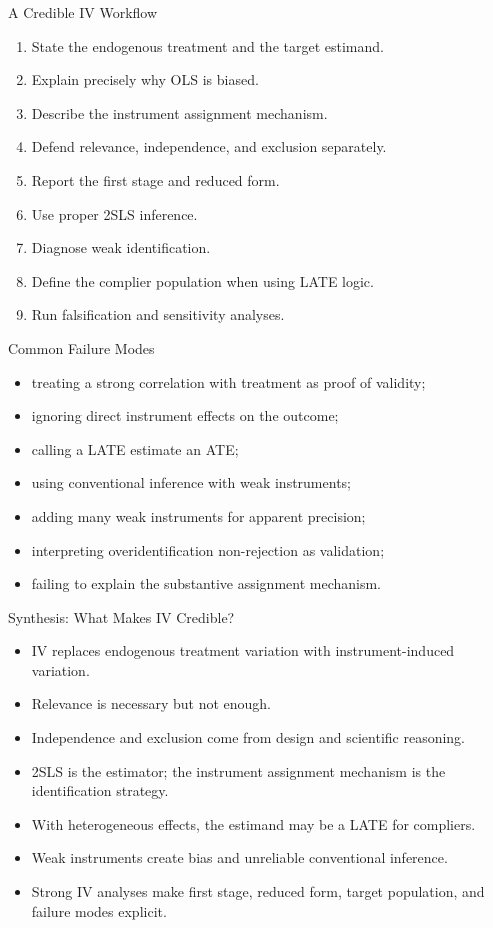 \documentclass[aspectratio=169,11pt]{beamer}
\begin{document}
\begin{frame}{A Credible IV Workflow}
\begin{enumerate}
\item State the endogenous treatment and the target estimand.
\item Explain precisely why OLS is biased.
\item Describe the instrument assignment mechanism.
\item Defend relevance, independence, and exclusion separately.
\item Report the first stage and reduced form.
\item Use proper 2SLS inference.
\item Diagnose weak identification.
\item Define the complier population when using LATE logic.
\item Run falsification and sensitivity analyses.
\end{enumerate}
\end{frame}

\begin{frame}{Common Failure Modes}
\begin{itemize}
\item treating a strong correlation with treatment as proof of validity;
\item ignoring direct instrument effects on the outcome;
\item calling a LATE estimate an ATE;
\item using conventional inference with weak instruments;
\item adding many weak instruments for apparent precision;
\item interpreting overidentification non-rejection as validation;
\item failing to explain the substantive assignment mechanism.
\end{itemize}
\end{frame}

\begin{frame}{Synthesis: What Makes IV Credible?}
\begin{itemize}
\item IV replaces endogenous treatment variation with instrument-induced variation.
\item Relevance is necessary but not enough.
\item Independence and exclusion come from design and scientific reasoning.
\item 2SLS is the estimator; the instrument assignment mechanism is the identification strategy.
\item With heterogeneous effects, the estimand may be a LATE for compliers.
\item Weak instruments create bias and unreliable conventional inference.
\item Strong IV analyses make first stage, reduced form, target population, and failure modes explicit.
\end{itemize}
\end{frame}
\end{document}
